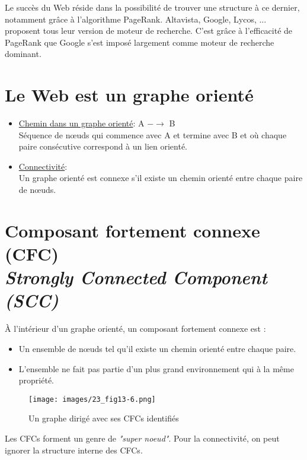 Le succès du Web réside dans la possibilité de trouver une structure à ce dernier, notamment grâce à l'algorithme PageRank. Altavista, Google, Lycos, ... proposent tous leur version de moteur de recherche. C'est grâce à l'efficacité de PageRank que Google s'est imposé largement comme moteur de recherche dominant.

\section{Le Web est un graphe orienté}
\begin{itemize}
\item \underline{Chemin dans un graphe orienté}: A $- \rightarrow$ B
\vspace{0.1cm}
\\Séquence de nœuds qui commence avec A et termine avec B et où chaque paire consécutive correspond à un lien orienté.

\item \underline{Connectivité}: 
\vspace{0.1cm}
\\Un graphe orienté est connexe s'il existe un chemin orienté entre chaque paire de nœuds.
\end{itemize}

\section{Composant fortement connexe (CFC) \\ \textit{Strongly Connected Component (SCC)} }

À l'intérieur d'un graphe orienté, un composant fortement connexe est :
\begin{itemize}
    \item Un ensemble de nœuds tel qu'il existe un chemin orienté entre chaque paire.
    \item L'ensemble ne fait pas partie d'un plus grand environnement qui à la même propriété. 
\end{itemize}

\begin{figure}[!ht]
\centering
\texttt{[image: images/23\_fig13-6.png]}
\caption{Un graphe dirigé avec ses CFCs identifiés}
\label{cfc_exemple}
\end{figure}

Les CFCs forment un genre de \textit{"super noeud"}. Pour la connectivité, on peut ignorer la structure interne des CFCs.

\vspace{0.3cm}

